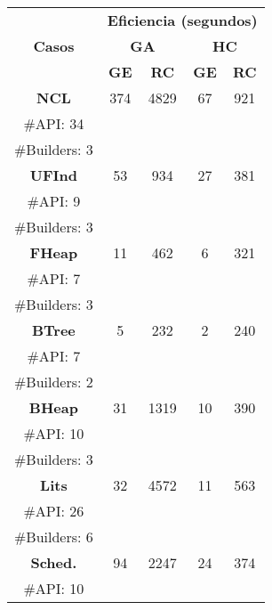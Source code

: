 \begin{table}[H]
\centering
\scriptsize
\begin{tabular}{cccccc}
\midrule
\multicolumn{2}{c}{\multirow{3}{*}{\textbf{Casos}}} & \multicolumn{4}{c}{\textbf{Eficiencia (segundos)}} \\
\cline{3-6}
\multicolumn{2}{c}{} & \multicolumn{2}{c}{\textbf{GA}} & \multicolumn{2}{c}{\textbf{HC}} \\
\multicolumn{2}{c}{} & \textbf{\tiny{GE}} & \textbf{\tiny{RC}} & \textbf{\tiny{GE}} & \textbf{\tiny{RC}} \\
\midrule
\multicolumn{2}{c}{\textbf{NCL}} & 374  & 4829  & 67  &921     \\
\multicolumn{2}{c}{\tiny \#API: 34} &  &   & &   \\
\multicolumn{2}{c}{\tiny \#Builders: 3} &  &   & &    \\
\midrule
\multicolumn{2}{c}{\textbf{UFInd}} & 53  & 934  & 27  &381    \\
\multicolumn{2}{c}{\tiny \#API: 9} &  &   & &  \\
\multicolumn{2}{c}{\tiny \#Builders: 3} &  &   & &  \\
\midrule
\multicolumn{2}{c}{\textbf{FHeap}} & 11  & 462  & 6  &321    \\
\multicolumn{2}{c}{\tiny \#API: 7} &  &   & &   \\
\multicolumn{2}{c}{\tiny \#Builders: 3} &  &   & &  \\
\midrule
\multicolumn{2}{c}{\textbf{BTree}} &  5 &  232 & 2  & 240  \\
\multicolumn{2}{c}{\tiny \#API: 7} &  &   & &  \\
\multicolumn{2}{c}{\tiny \#Builders: 2} &  &   & &   \\
\midrule
\multicolumn{2}{c}{\textbf{BHeap}} & 31 &  1319 & 10 & 390  \\
\multicolumn{2}{c}{\tiny \#API: 10} &  &   & &   \\
\multicolumn{2}{c}{\tiny \#Builders: 3} &  &   & &   \\
\midrule
\multicolumn{2}{c}{\textbf{Lits}} & 32  & 4572  & 11  &  563   \\
\multicolumn{2}{c}{\tiny \#API: 26} &  &   & &   \\
\multicolumn{2}{c}{\tiny \#Builders: 6} &  &   & &   \\
\midrule
\multicolumn{2}{c}{\textbf{Sched.}} &   94& 2247  & 24  & 374     \\
\multicolumn{2}{c}{\tiny \#API: 10} &  &   & &    \\

\end{tabular}
\end{table}
